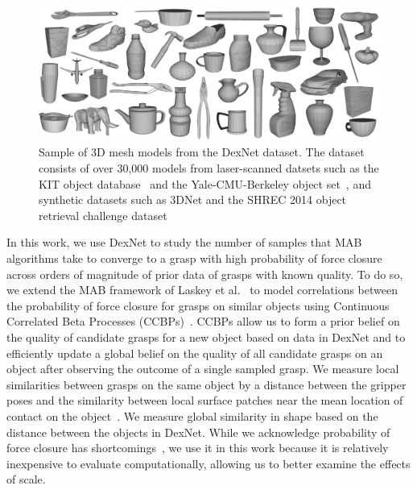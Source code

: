 \begin{figure}[t!]
\centering
\includegraphics[scale=0.085]{figures/dexnet_collage.jpg}
\caption{Sample of 3D mesh models from the DexNet dataset. The dataset consists of over 30,000 models from laser-scanned datsets such as the KIT object database~\cite{kasper2012kit} and the Yale-CMU-Berkeley object set~\cite{calli2015benchmarking}, and synthetic datasets such as 3DNet\cite{wohlkinger20123dnet} and the SHREC 2014 object retrieval challenge dataset~\cite{li2015comparison} }
\vspace*{-15pt}
\end{figure}

In this work, we use DexNet to study the number of samples that MAB algorithms take to converge to a grasp with high probability of force closure across orders of magnitude of prior data of grasps with known quality.
To do so, we extend the MAB framework of Laskey et al.~\cite{laskey2015bandits} to model correlations between the probability of force closure for grasps on similar objects using Continuous Correlated Beta Processes (CCBPs)~\cite{goetschalckx2011continuous, montesano2012active}.
CCBPs allow us to form a prior belief on the quality of candidate grasps for a new object based on data in DexNet and to efficiently update a global belief on the quality of all candidate grasps on an object after observing the outcome of a single sampled grasp.
We measure local similarities between grasps on the same object by a distance between the gripper poses and the similarity between local surface patches near the mean location of contact on the object~\cite{herzog2014learning, kappler2015leveraging}.
We measure global similarity in shape based on the distance between the objects in DexNet.
While we acknowledge probability of force closure has shortcomings~\cite{balasubramanian2012physical}, we use it in this work because it is relatively inexpensive to evaluate computationally, allowing us to better examine the effects of scale.

